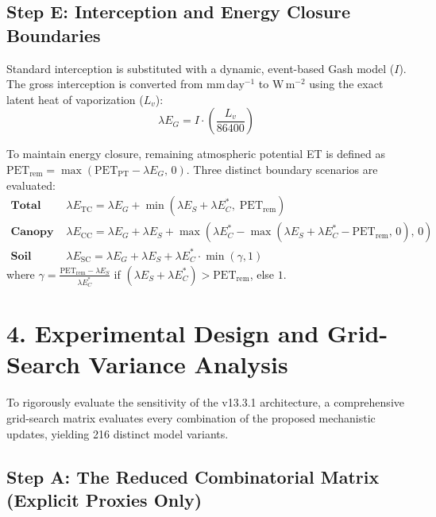 \documentclass[11pt]{article}
\begin{document}
\subsection*{Step E: Interception and Energy Closure Boundaries}

Standard interception is substituted with a dynamic, event-based Gash model ($I$). The gross interception is converted from $\mathrm{mm\,day^{-1}}$ to $\mathrm{W\,m^{-2}}$ using the exact latent heat of vaporization ($L_v$):
\begin{equation}
  \lambda E_{G} = I \cdot \left(\frac{L_v}{86400}\right)
\end{equation}

To maintain energy closure, remaining atmospheric potential ET is defined as $\mathrm{PET}_{\mathrm{rem}} = \max(\mathrm{PET}_{\mathrm{PT}} - \lambda E_{G},\, 0)$. Three distinct boundary scenarios are evaluated:
\begin{align}
  \textbf{Total Capped (TC): } & \lambda E_{\mathrm{TC}} = \lambda E_{G} + \min(\lambda E_{S} + \lambda E_{C}^{\ast},\; \mathrm{PET}_{\mathrm{rem}}) \\
  \textbf{Canopy Capped (CC): } & \lambda E_{\mathrm{CC}} = \lambda E_{G} + \lambda E_{S} + \max(\lambda E_{C}^{\ast} - \max(\lambda E_{S} + \lambda E_{C}^{\ast} - \mathrm{PET}_{\mathrm{rem}},\, 0),\, 0) \\
  \textbf{Soil Capped (SC): } & \lambda E_{\mathrm{SC}} = \lambda E_{G} + \lambda E_{S} + \lambda E_{C}^{\ast} \cdot \min\left(\gamma, 1\right)
\end{align}
where $\gamma = \frac{\mathrm{PET}_{\mathrm{rem}} - \lambda E_S}{\lambda E_C^\ast}$ if $(\lambda E_S + \lambda E_C^\ast) > \mathrm{PET}_{\mathrm{rem}}$, else $1$.

\section*{4. Experimental Design and Grid-Search Variance Analysis}

To rigorously evaluate the sensitivity of the v13.3.1 architecture, a comprehensive grid-search matrix evaluates every combination of the proposed mechanistic updates, yielding 216 distinct model variants.

\subsection*{Step A: The Reduced Combinatorial Matrix (Explicit Proxies Only)}
\end{document}
